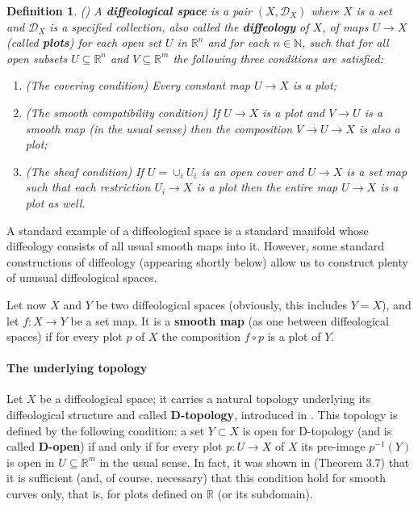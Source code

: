 \documentclass{article}
\newtheorem{defn}[lemma]{Definition}
\newcommand\matR{{\mathbb{R}}}
\newcommand\matN{{\mathbb{N}}}
\newcommand\calD{{\mathcal D}}
\begin{document}
\begin{defn} \emph{(\cite{So2})} A \textbf{diffeological space} is a pair $(X,\calD_X)$ where $X$ is a set and $\calD_X$ is a specified collection, also called the \textbf{diffeology} of $X$, of maps $U\to X$ 
(called \textbf{plots}) for each open set $U$ in $\matR^n$ and for each $n\in\matN$, such that for all open subsets $U\subseteq\matR^n$ and $V\subseteq\matR^m$ the following three conditions are 
satisfied:
\begin{enumerate}
\item (The covering condition) Every constant map $U\to X$ is a plot;
\item (The smooth compatibility condition) If $U\to X$ is a plot and $V\to U$ is a smooth map (in the usual sense) then the composition $V\to U\to X$ is also a plot;
\item (The sheaf condition) If $U=\cup_iU_i$ is an open cover and $U\to X$ is a set map such that each restriction $U_i\to X$ is a plot then the entire map $U\to X$ is a plot as well.
\end{enumerate}
\end{defn}

A standard example of a diffeological space is a standard manifold whose diffeology consists of all usual smooth maps into it. However, some standard constructions of diffeology (appearing shortly below)
allow us to construct plenty of unusual diffeological spaces.

Let now $X$ and $Y$ be two diffeological spaces (obviously, this includes $Y=X$), and let $f:X\to Y$ be a set map. It is a \textbf{smooth map} (as one between diffeological spaces) if for every plot $p$ of $X$ 
the composition $f\circ p$ is a plot of $Y$.

\paragraph{The underlying topology} Let $X$ be a diffeological space; it carries a natural topology underlying its diffeological structure and called \textbf{D-topology}, introduced in \cite{iglFibre}. This 
topology is defined by the following condition: a set $Y\subset X$ is open for D-topology (and is called \textbf{D-open}) if and only if for every plot $p:U\to X$ of $X$ its pre-image $p^{-1}(Y)$ is open in
$U\subseteq\matR^m$ in the usual sense. In fact, it was shown in \cite{CSW_Dtopology} (Theorem 3.7) that it is sufficient (and, of course, necessary) that this condition hold for smooth curves only, that is, 
for plots defined on $\matR$ (or its subdomain).
\end{document}
